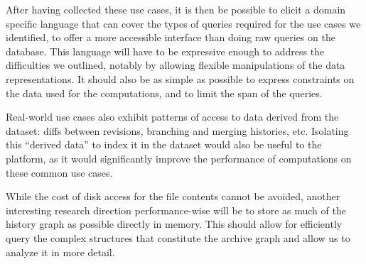 After having collected these use cases, it is then be possible to elicit a
domain specific language that can cover the types of queries required
for the use cases we identified, to offer a more accessible interface than
doing raw queries on the database. This language will have to be expressive
enough to address the difficulties we outlined, notably by allowing flexible
manipulations of the data representations. It should also be as simple as
possible to express constraints on the data used for the computations, and to
limit the span of the queries.

Real-world use cases also exhibit patterns of access to data derived from
the dataset: diffs between revisions, branching and merging histories,
etc. Isolating this ``derived data'' to index it in the dataset would also be
useful to the platform, as it would significantly improve the performance of
computations on these common use cases.

While the cost of disk access for the file contents cannot be avoided, another
interesting research direction performance-wise will be to store as much of the
history graph as possible directly in memory. This should allow for efficiently
query the complex structures that constitute the archive graph and allow us to
analyze it in more detail.
